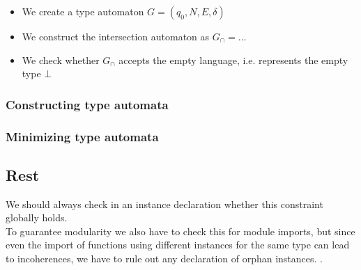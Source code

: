 \begin{itemize}
  \item We create a type automaton $G = (q_0, N, E, \delta)$
  \item We construct the intersection automaton as $G_\cap = \dots$
  \item We check whether $G_\cap$ accepts the empty language, i.e. represents the empty type $\bot$
\end{itemize}

\subsubsection{Constructing type automata}
\subsubsection{Minimizing type automata}


\subsection{Rest}
We should always check in an instance declaration whether this constraint globally holds. \\
To guarantee modularity we also have to check this for module imports, but since even the import of functions using different instances for the same type can lead to incoherences, we have to rule out any declaration of orphan instances.
\cite{Kilpatrick2019-cy}.
